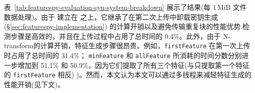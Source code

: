 \begin{table}[!htb]
    \small
    \centering
    \setlength{\tabcolsep}{5pt}
    \renewcommand{\arraystretch}{1.05}
    \caption{(Exp\#5) 处理随机文件数据每 1\,MiB 的时间分解(单位：ms)。 除括号中明确指定外，第二次上传的每一步所消耗的时间与第一次上传的相同。}
    \label{tab:featurespy-evaluation-syn-system-breakdown}
\end{table}
表~\ref{tab:featurespy-evaluation-syn-system-breakdown} 展示了结果(每 1\,MiB 文件数据处理)。由于 \prototype 建立在 \sysnameS \cite{ren21} 之上，它继承了在第二次上传中卸载密钥生成 (\S\ref{sec:featurespy-implementation}) 的计算开销以及避免传输重复块的性能优势.检测步骤是高效的，并且在上传过程中占用了总时间的 0.4\%。此外，由于 N-transform的计算开销，特征生成步骤很昂贵。例如，{\tt firstFeature} 在第一次上传时占用了总时间的 31.4\%； {\tt minFeature} 和 {\tt allFeature} 所消耗的时间分数分别进一步增加到 51.1\% 和 50.9\%，因为它们提取了所有三个特征(与只提取第一个特征的 {\tt firstFeature} 相反) )。然而，本文认为本文可以通过多线程来减轻特征生成的性能开销(见下文)。


